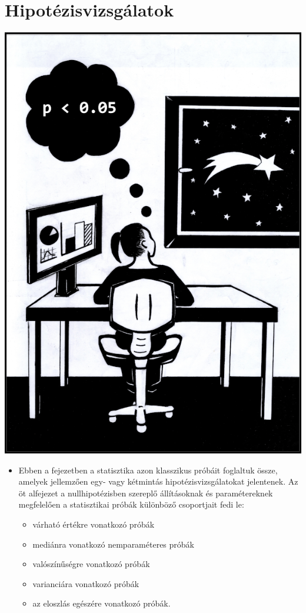 \documentclass[
]{book}
\providecommand{\tightlist}{%
  \setlength{\itemsep}{0pt}\setlength{\parskip}{0pt}}
\newenvironment{rmdblock}[1]
  {\begin{shaded*}
  \begin{itemize}
  \renewcommand{\labelitemi}{
    \raisebox{-.7\height}[0pt][0pt]{
      {\setkeys{Gin}{width=3em,keepaspectratio}\texttt{[image: images/\#1]}}
    }
  }
  \item
  }
  {
  \end{itemize}
  \end{shaded*}
  }
\newenvironment{rmdlevel1}
  {\begin{rmdblock}{level1}}
  {\end{rmdblock}}
\begin{document}
\hypertarget{hipotezisvizsgalatok}{%
\chapter{Hipotézisvizsgálatok}\label{hipotezisvizsgalatok}}

\begin{center}\includegraphics[width=0.7\linewidth]{images/ch_10_small} \end{center}

\begin{rmdlevel1}
Ebben a fejezetben a statisztika azon klasszikus próbáit foglaltuk össze, amelyek jellemzően egy- vagy kétmintás hipotézisvizsgálatokat jelentenek. Az öt alfejezet a nullhipotézisben szereplő állításoknak és paramétereknek megfelelően a statisztikai próbák különböző csoportjait fedi le:

\begin{itemize}
\tightlist
\item
  várható értékre vonatkozó próbák
\item
  mediánra vonatkozó nemparaméteres próbák
\item
  valószínűségre vonatkozó próbák
\item
  varianciára vonatkozó próbák
\item
  az eloszlás egészére vonatkozó próbák.
\end{itemize}
\end{rmdlevel1}
\end{document}
